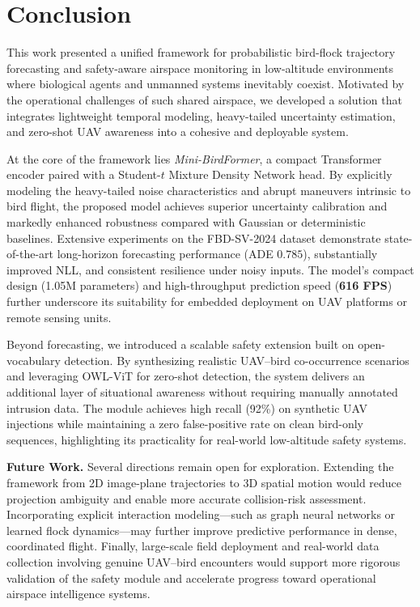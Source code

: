 \documentclass[journal]{IEEEtran}
\begin{document}
	
\section{Conclusion}
\label{sec:conclusion}

This work presented a unified framework for probabilistic bird-flock trajectory forecasting and safety-aware airspace monitoring in low-altitude environments where biological agents and unmanned systems inevitably coexist. Motivated by the operational challenges of such shared airspace, we developed a solution that integrates lightweight temporal modeling, heavy-tailed uncertainty estimation, and zero-shot UAV awareness into a cohesive and deployable system.

At the core of the framework lies \textit{Mini-BirdFormer}, a compact Transformer encoder paired with a Student-$t$ Mixture Density Network head. By explicitly modeling the heavy-tailed noise characteristics and abrupt maneuvers intrinsic to bird flight, the proposed model achieves superior uncertainty calibration and markedly enhanced robustness compared with Gaussian or deterministic baselines. Extensive experiments on the FBD-SV-2024 dataset demonstrate state-of-the-art long-horizon forecasting performance (ADE $0.785$), substantially improved NLL, and consistent resilience under noisy inputs. The model’s compact design (1.05M parameters) and high-throughput prediction speed (\textbf{616 FPS}) further underscore its suitability for embedded deployment on UAV platforms or remote sensing units.

Beyond forecasting, we introduced a scalable safety extension built on open-vocabulary detection. By synthesizing realistic UAV–bird co-occurrence scenarios and leveraging OWL-ViT for zero-shot detection, the system delivers an additional layer of situational awareness without requiring manually annotated intrusion data. The module achieves high recall (92\%) on synthetic UAV injections while maintaining a zero false-positive rate on clean bird-only sequences, highlighting its practicality for real-world low-altitude safety systems.

\textbf{Future Work.} Several directions remain open for exploration. Extending the framework from 2D image-plane trajectories to 3D spatial motion would reduce projection ambiguity and enable more accurate collision-risk assessment. Incorporating explicit interaction modeling—such as graph neural networks or learned flock dynamics—may further improve predictive performance in dense, coordinated flight. Finally, large-scale field deployment and real-world data collection involving genuine UAV–bird encounters would support more rigorous validation of the safety module and accelerate progress toward operational airspace intelligence systems.
\end{document}
